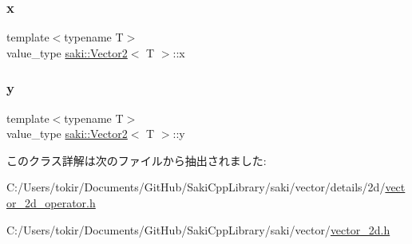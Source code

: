 \subsubsection{\texorpdfstring{x}{x}}
{\footnotesize\ttfamily template$<$typename T$>$ \\
value\+\_\+type \mbox{\hyperlink{classsaki_1_1_vector2}{saki\+::\+Vector2}}$<$ T $>$\+::x}

\mbox{\label{classsaki_1_1_vector2_a405e46e838ba0e6ebbe8aadd204c53da}} 
\subsubsection{\texorpdfstring{y}{y}}
{\footnotesize\ttfamily template$<$typename T$>$ \\
value\+\_\+type \mbox{\hyperlink{classsaki_1_1_vector2}{saki\+::\+Vector2}}$<$ T $>$\+::y}



このクラス詳解は次のファイルから抽出されました\+:\begin{DoxyCompactItemize}
\item 
C\+:/\+Users/tokir/\+Documents/\+Git\+Hub/\+Saki\+Cpp\+Library/saki/vector/details/2d/\mbox{\hyperlink{vector__2d__operator_8h}{vector\+\_\+2d\+\_\+operator.\+h}}\item 
C\+:/\+Users/tokir/\+Documents/\+Git\+Hub/\+Saki\+Cpp\+Library/saki/vector/\mbox{\hyperlink{vector__2d_8h}{vector\+\_\+2d.\+h}}\end{DoxyCompactItemize}

